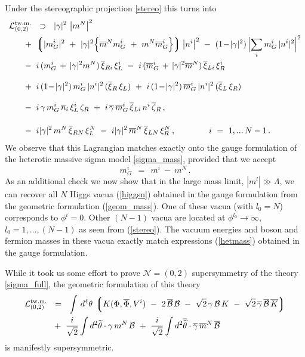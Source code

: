 \documentclass[12pt]{article}
\newcommand{\ntwoo}{${\mathcal N}= \left(0,2\right) $ }
\newcommand{\wt}{\widetilde}
\newcommand{\ov}{\overline}
\newcommand{\mc}[1]{\mathcal{#1}}
\newcommand{\lgr}{\left\lgroup}
\newcommand{\rgr}{\right\rgroup}
\newcommand{\bxir}{\ov{\xi}{}_R}
\newcommand{\bxil}{\ov{\xi}{}_L}
\newcommand{\xir}{\xi_R}
\newcommand{\xil}{\xi_L}
\newcommand{\bzr}{\ov{\zeta}{}_R}
\newcommand{\zr}{\zeta_R}
\newcommand{\bgamma}{\ov{\gamma}}
\newcommand{\bxi}{\ov{\xi}{}}
\begin{document}
Under the stereographic projection \eqref{stereo} this turns into
\begin{align*}
%
	\mc{L}_{(0,2)}^\text{tw.m.} & 
	~~\supset~~ 
	|\gamma|^2\, \left|m^N\right|^2 
	\\
%
	&\!\!\!\!\!\!\!\!
	~+~
	\lgr |m_G^i|^2 ~+~
		|\gamma|^2 \Bigl\{ \ov{m}{}^N m_G^i ~+~ m^N \ov{m}{}_G^i \Bigr\} \rgr \left|n^i \right|^2 
	~-~ (1 \!-\! |\gamma|^2)\, \Bigl| \sum_i m_G^i\, |n^i|^2 \Bigr|^2 
	\\
%
	&\!\!\!\!\!\!\!\!
	~-~ i\, ( m_G^i \,+\, |\gamma|^2 m^N )\, \bxi_{Ri}\, \xi_L^i
	~-~ i\, (\ov{m}{}_G^i \,+\, |\gamma|^2 \ov{m}{}^N )\, \bxi_{Li}\, \xi_R^i
	\\[3mm]
%
	&\!\!\!\!\!\!\!\!
	~+~ i\,(1\!-\!|\gamma|^2)\, m_G^i\,|n^i|^2\, (\bxir\,\xil) 
	~+~ i\,(1\!-\!|\gamma|^2)\, \ov{m}{}_G^i\,|n^i|^2\, (\bxil\,\xir)
	\\[3mm]
%
	&\!\!\!\!\!\!\!\!
	~-~ i\,\gamma\, m_G^i\,\ov{n}{}_i\, \xi_L^i\, \zr
	~+~ i\,\bgamma\, \ov{m}{}_G^i\, \bxi_{Li}\, n^i\, \bzr\,,
	\\[4mm]
%
	&\!\!\!\!\!\!\!\!
	~-~ i |\gamma|^2\, m^N\, \ov{\xi}{}_{RN}\, \xi_L^N
	~-~ i |\gamma|^2\, \ov{m}^N\, \ov{\xi}{}_{LN}\, \xi_R^N\,,
	\qquad\qquad
	i ~=~ 1,...\,N-1\,.
\end{align*}
	We observe that this Lagrangian matches exactly
	onto the gauge formulation of the heterotic massive sigma model \eqref{sigma_mass}, provided that
	we accept
\[
	m_G^i ~~=~~ m^i ~-~ m^N \,.
\]
As an additional check we now show that in the 
large  mass limit, $|m^l|\gg \Lambda$, we can
recover all $N$ Higgs vacua (\ref{higgsn}) obtained in the
gauge formulation from the geometric formulation (\ref{geom_mass}). One of these vacua (with $l_0=N$) corresponds
to $\phi^i=0$. Other $(N-1)$ vacua are located at $\phi^{l_0}\to\infty$, $l_0=1,...,(N-1)$ as  seen from 
(\ref{stereo}). The vacuum energies and boson and fermion masses 
in these vacua exactly match expressions (\ref{hetmass})
obtained in the gauge formulation.

	While it took us some effort to prove \ntwoo supersymmetry of the theory \eqref{sigma_full},
	the geometric formulation of this theory 
\begin{align*}
	\mc{L}_{(0,2) }^\text{tw.m.} & 
	~~=~~ \int\, d^4\theta\, \lgr K(\Phi,\ov{\Phi}, V^i) 
		~-~ 2\, \ov{\mc{B}}\,\mc{B}  
		~-~  \sqrt{2}\, \gamma\,\mc{B}\,K  ~-~ \sqrt{2}\, \ov{\gamma}\,\ov{\mc{B}}\,\ov{K} \rgr
	\\
%
	&~
	~+~ \frac{i}{\sqrt{2}} \int d^2\wt{\theta} \cdot \gamma\,m^N\,\mc{B} 
	~+~ \frac{i}{\sqrt{2}} \int d^2\ov{\wt{\theta}} \cdot \bgamma\, \ov{m}{}^N\, \ov{\mc{B}}
\end{align*}
	is manifestly supersymmetric.
	
\end{document}
